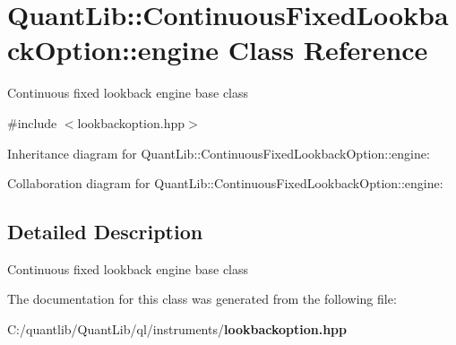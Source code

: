 \section{Quant\+Lib\+:\+:Continuous\+Fixed\+Lookback\+Option\+:\+:engine Class Reference}
\label{class_quant_lib_1_1_continuous_fixed_lookback_option_1_1engine}


Continuous fixed lookback engine base class  




{\ttfamily \#include $<$lookbackoption.\+hpp$>$}



Inheritance diagram for Quant\+Lib\+:\+:Continuous\+Fixed\+Lookback\+Option\+:\+:engine\+:


Collaboration diagram for Quant\+Lib\+:\+:Continuous\+Fixed\+Lookback\+Option\+:\+:engine\+:


\subsection{Detailed Description}
Continuous fixed lookback engine base class 

The documentation for this class was generated from the following file\+:\begin{DoxyCompactItemize}
\item 
C\+:/quantlib/\+Quant\+Lib/ql/instruments/{\bf lookbackoption.\+hpp}\end{DoxyCompactItemize}
